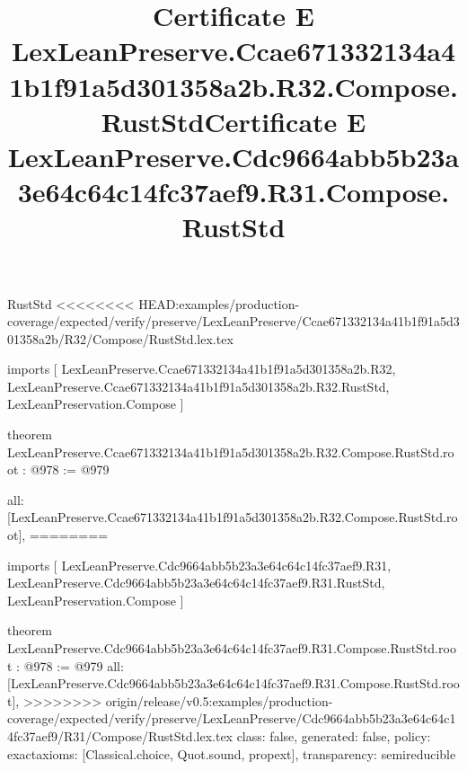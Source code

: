 \begin{lexlean}{RustStd}
<<<<<<<< HEAD:examples/production-coverage/expected/verify/preserve/LexLeanPreserve/Ccae671332134a41b1f91a5d301358a2b/R32/Compose/RustStd.lex.tex
\title{Certificate E LexLeanPreserve.Ccae671332134a41b1f91a5d301358a2b.R32.Compose.RustStd}
\begin{coremodule}
imports [
  LexLeanPreserve.Ccae671332134a41b1f91a5d301358a2b.R32,
  LexLeanPreserve.Ccae671332134a41b1f91a5d301358a2b.R32.RustStd,
  LexLeanPreservation.Compose
]

theorem LexLeanPreserve.Ccae671332134a41b1f91a5d301358a2b.R32.Compose.RustStd.root : @978 := @979 {
  all: [LexLeanPreserve.Ccae671332134a41b1f91a5d301358a2b.R32.Compose.RustStd.root],
========
\title{Certificate E LexLeanPreserve.Cdc9664abb5b23a3e64c64c14fc37aef9.R31.Compose.RustStd}
\begin{coremodule}
imports [
  LexLeanPreserve.Cdc9664abb5b23a3e64c64c14fc37aef9.R31,
  LexLeanPreserve.Cdc9664abb5b23a3e64c64c14fc37aef9.R31.RustStd,
  LexLeanPreservation.Compose
]

theorem LexLeanPreserve.Cdc9664abb5b23a3e64c64c14fc37aef9.R31.Compose.RustStd.root : @978 := @979 {
  all: [LexLeanPreserve.Cdc9664abb5b23a3e64c64c14fc37aef9.R31.Compose.RustStd.root],
>>>>>>>> origin/release/v0.5:examples/production-coverage/expected/verify/preserve/LexLeanPreserve/Cdc9664abb5b23a3e64c64c14fc37aef9/R31/Compose/RustStd.lex.tex
  class: false,
  generated: false,
  policy: exact{axioms: [Classical.choice, Quot.sound, propext]},
  transparency: semireducible
}


\end{coremodule}}
\end{coremodule}
\end{lexlean}
